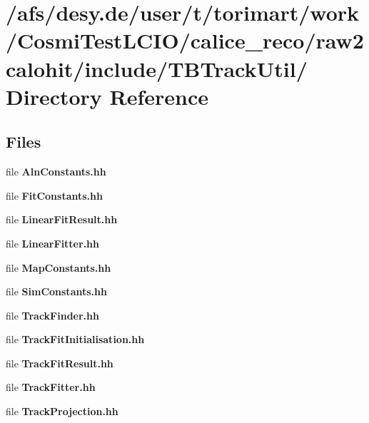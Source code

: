 \section{/afs/desy.de/user/t/torimart/work/CosmiTestLCIO/calice\_\-reco/raw2calohit/include/TBTrackUtil/ Directory Reference}
\label{dir_660781268e08db16f85666f792f83ce3}
\subsection*{Files}
\begin{DoxyCompactItemize}
\item 
file {\bfseries AlnConstants.hh}
\item 
file {\bfseries FitConstants.hh}
\item 
file {\bfseries LinearFitResult.hh}
\item 
file {\bfseries LinearFitter.hh}
\item 
file {\bfseries MapConstants.hh}
\item 
file {\bfseries SimConstants.hh}
\item 
file {\bfseries TrackFinder.hh}
\item 
file {\bfseries TrackFitInitialisation.hh}
\item 
file {\bfseries TrackFitResult.hh}
\item 
file {\bfseries TrackFitter.hh}
\item 
file {\bfseries TrackProjection.hh}
\end{DoxyCompactItemize}

